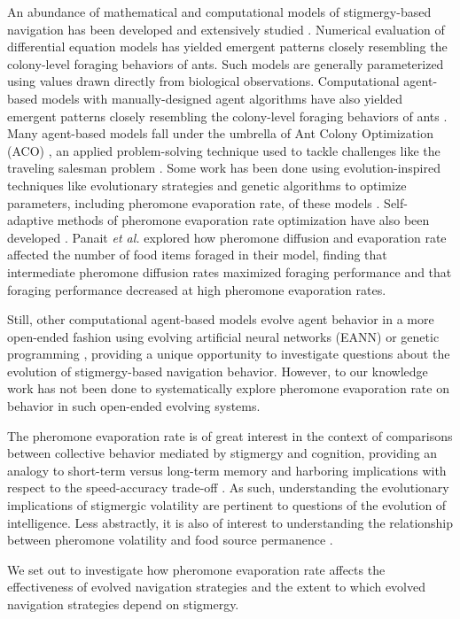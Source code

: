 An abundance of mathematical and computational models of stigmergy-based navigation has been developed and extensively studied \cite{perna2012individual, ryan2016model}.
Numerical evaluation of differential equation models has yielded emergent patterns closely resembling the colony-level foraging behaviors of ants.
Such models are generally parameterized using values drawn directly from biological observations.
Computational agent-based models with manually-designed agent algorithms have also yielded emergent patterns closely resembling the colony-level foraging behaviors of ants \cite{robinson2008agent, pratt2005agent}.
Many agent-based models fall under the umbrella of Ant Colony Optimization (ACO) \cite{dorigo1996ant}, an applied problem-solving technique used to tackle challenges like the traveling salesman problem \cite{dorigo1997ant, bianchi2002ant}.
Some work has been done using evolution-inspired techniques like evolutionary strategies and genetic algorithms to optimize parameters, including pheromone evaporation rate, of these models \cite{kuyucu2012evolutionary, sauter2002evolving}.
Self-adaptive methods of pheromone evaporation rate optimization have also been developed \cite{mavrovouniotis2014ant, mavrovouniotis2013adapting}.
Panait \textit{et al.}\cite{panait2004ant} explored how pheromone diffusion and evaporation rate affected the number of food items foraged in their model, finding that intermediate pheromone diffusion rates maximized foraging performance and that foraging performance decreased at high pheromone evaporation rates.

Still, other computational agent-based models evolve agent behavior in a more open-ended fashion using evolving artificial neural networks (EANN) \cite{collins1991antfarm} or genetic programming \cite{connelly2009evolving}, providing a unique opportunity to investigate questions about the evolution of stigmergy-based navigation behavior.
However, to our knowledge work has not been done to systematically explore pheromone evaporation rate on behavior in such open-ended evolving systems.

The pheromone evaporation rate is of great interest in the context of comparisons between collective behavior mediated by stigmergy and cognition, providing an analogy to short-term versus long-term memory and harboring implications with respect to the speed-accuracy trade-off \cite{couzin2009collective, correia2017role}.
As such, understanding the evolutionary implications of stigmergic volatility are pertinent to questions of the evolution of intelligence.
Less abstractly, it is also of interest to understanding the relationship between pheromone volatility and food source permanence \cite{howard_costs_2001,robinson_decay_2008}.

We set out to investigate how pheromone evaporation rate affects the effectiveness of evolved navigation strategies and the extent to which evolved navigation strategies depend on stigmergy.
